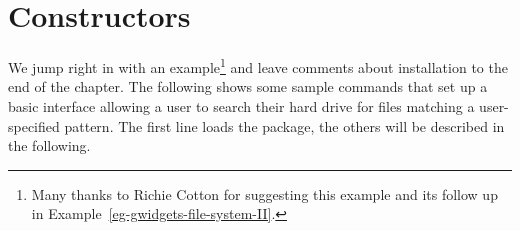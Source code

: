 






\section{Constructors}
\label{sec:constructors}

We jump right in with an example\footnote{Many thanks to Richie
  Cotton for suggesting this example and its follow up in
  Example~\ref{eg-gwidgets-file-system-II}.} and leave comments about
installation to the end of the chapter. The following shows some
sample  commands that set up a basic interface allowing
a user to search their hard drive for files matching a user-specified
pattern. The first line loads the package, the others will be
described in the following.




